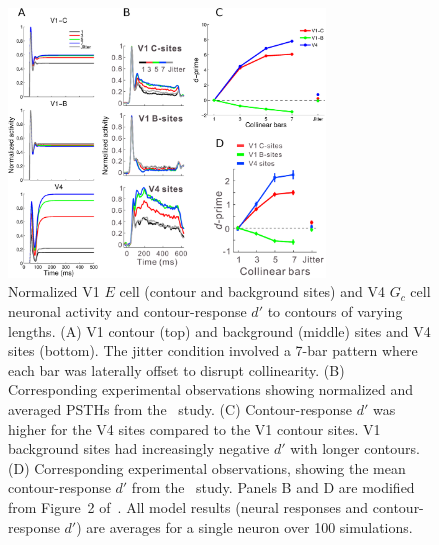 \begin{figure}[t!]
\centering
\includegraphics[width=0.75\textwidth]{Contour/figs/Fig4.eps}
\makeatletter
\let\@currsize\normalsize
\caption[Time course of neural activity in V1 and V4 and the contour-response d-prime measure]{Normalized V1 $E$ cell (contour and background sites) and V4 $G_c$ cell neuronal activity and contour-response $d'$ to contours of varying lengths. (A) V1 contour (top) and background (middle) sites and V4 sites (bottom).
The jitter condition involved a 7-bar pattern where each bar was laterally offset to disrupt collinearity. (B) Corresponding experimental observations showing normalized and averaged PSTHs from the~\cite{Chen_etal14} study. (C) Contour-response $d'$ was higher for the V4 sites compared to the V1 contour sites.
V1 background sites had increasingly  negative $d'$ with longer contours.
(D) Corresponding experimental observations, showing the mean contour-response $d'$ from the~\cite{Chen_etal14} study. Panels B and D are modified from Figure~2 of~\cite{Chen_etal14}. All model results (neural responses and contour-response $d'$) are averages for a single neuron over 100 simulations.}
\label{Fig:Neural_responses}
\end{figure}

